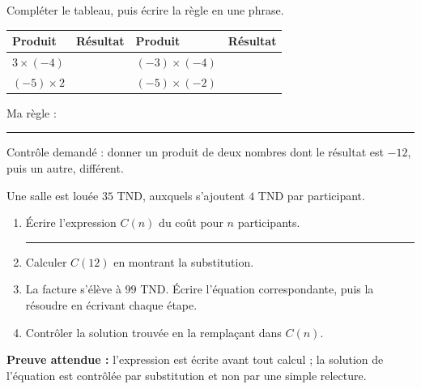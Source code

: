 \documentclass[10pt,a4paper]{article}
\begin{document}
Compléter le tableau, puis écrire la règle en une phrase.
\par\noindent\begin{tabularx}{\linewidth}{>{\bfseries}p{30mm} X >{\bfseries}p{30mm} X}
\toprule
Produit & Résultat & Produit & Résultat \\
\midrule
$3 \times (-4)$ & & $(-3)\times(-4)$ & \\
$(-5)\times 2$ & & $(-5)\times(-2)$ & \\
\bottomrule
\end{tabularx}
\par\vspace{1mm}
Ma règle : \rule{125mm}{0.32pt}
\par\vspace{1mm}
Contrôle demandé : donner un produit de deux nombres dont le résultat est $-12$, puis un autre, différent.

Une salle est louée $35$ TND, auxquels s'ajoutent $4$ TND par participant.
\begin{enumerate}
\item Écrire l'expression $C(n)$ du coût pour $n$ participants. \rule{60mm}{0.32pt}
\item Calculer $C(12)$ en montrant la substitution.
\item La facture s'élève à $99$ TND. Écrire l'équation correspondante, puis la résoudre en écrivant chaque étape.
\item Contrôler la solution trouvée en la remplaçant dans $C(n)$.
\end{enumerate}

\begin{successbox}
\textbf{Preuve attendue :} l'expression est écrite avant tout calcul ; la solution de l'équation est
contrôlée par substitution et non par une simple relecture.
\end{successbox}

\needspace{62mm}\par\vspace{3mm}
\end{document}
